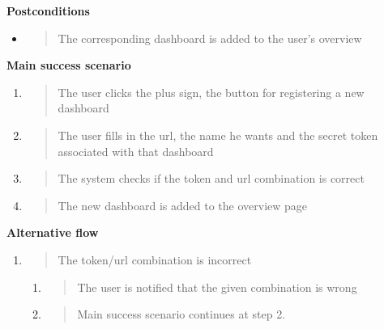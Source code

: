 \textbf{Postconditions}

\begin{itemize}
\item
  \begin{quote}
  The corresponding dashboard is added to the user's overview
  \end{quote}
\end{itemize}

\textbf{Main success scenario}

\begin{enumerate}
\def\labelenumi{\arabic{enumi}.}
\item
  \begin{quote}
  The user clicks the plus sign, the button for registering a new
  dashboard
  \end{quote}
\item
  \begin{quote}
  The user fills in the url, the name he wants and the secret token
  associated with that dashboard
  \end{quote}
\item
  \begin{quote}
  The system checks if the token and url combination is correct
  \end{quote}
\item
  \begin{quote}
  The new dashboard is added to the overview page
  \end{quote}
\end{enumerate}

\textbf{Alternative flow}

\begin{enumerate}
\def\labelenumi{\arabic{enumi}.}
\setcounter{enumi}{2}
\item
  \begin{quote}
  The token/url combination is incorrect
  \end{quote}

  \begin{enumerate}
  \def\labelenumii{\alph{enumii}.}
  \item
    \begin{quote}
    The user is notified that the given combination is wrong
    \end{quote}
  \item
    \begin{quote}
    Main success scenario continues at step 2.
    \end{quote}
  \end{enumerate}
\end{enumerate}

